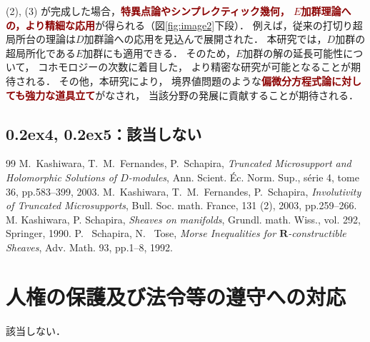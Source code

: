 \documentclass[10pt,a4paper,uplatex,dvipdfmx]{ujarticle} 		%
\newcommand{\研究課題名}{打切り超局所台の関手的性質の研究とMorse理論への応用}
\newcommand{\研究機関名}{北海道大学}
\newcommand{\研究代表者氏名}{大柴寿浩}
\newcommand{\ctext}[1]{\raise0.2ex\hbox{\textcircled{\scriptsize{#1}}}}
\begin{document}
(2), (3) が完成した場合，\textcolor{darkred}{\textbf{特異点論やシンプレクティック幾何，
\(E\)加群理論への，より精細な応用}}が得られる（図\ref{fig:image2}下段）．
例えば，従来の打切り超局所台の理論は\(D\)加群論への応用を見込んで展開された．
本研究では，\(D\)加群の超局所化である\(E\)加群にも適用できる．
そのため，\(E\)加群の解の延長可能性について，
コホモロジーの次数に着目した，
より精密な研究が可能となることが期待される．
その他，本研究により，
境界値問題のような\textcolor{darkred}{\textbf{偏微分方程式論に対しても強力な道具立て}}がなされ，
当該分野の発展に貢献することが期待される．

\vspace{-10pt}
\subsection*{\ctext{4}, \ctext{5}：該当しない}
\begin{thebibliography}{99}
		{\small
		 M.~Kashiwara, T.~M.~Fernandes, 
		P.~Schapira, 
		\textit{Truncated Microsupport and Holomorphic Solutions 
		of \(D\)-modules}, 
		Ann. Scient. \'Ec. Norm. Sup., s\'erie 4, tome 36, 
		pp.583--399, 2003.
		\vspace{-6pt}	
		 M.~Kashiwara, T.~M.~Fernandes, 
		P.~Schapira, 
		\textit{Involutivity of Truncated Microsupports}, 
		Bull. Soc. math. France, 131 (2), 2003, 
		pp.259--266.
		\vspace{-6pt}	
		 M. Kashiwara, P. Schapira, \emph{Sheaves on manifolds}, Grundl. math. Wiss., vol. 292, Springer, 1990.
		\vspace{-6pt}
		 P.~ Schapira, N.~ Tose, 
		\textit{Morse Inequalities for \(\mathbf{R}\)-constructible Sheaves}, 
		Adv. Math. 93, pp.1--8, 1992. 
		}
\end{thebibliography}
	



\section{人権の保護及び法令等の遵守への対応}

	該当しない．
\end{document}
